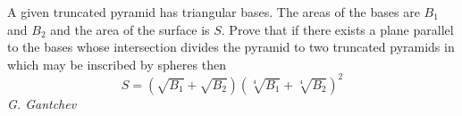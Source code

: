 A given truncated pyramid has triangular bases. The areas of the bases are $B_1$ and $B_2$ and the area of the surface is $S$. Prove that if there exists a plane parallel to the bases whose intersection divides the pyramid to two truncated pyramids in which may be inscribed by spheres then
$$S=(\sqrt{B_1}+\sqrt{B_2})(\sqrt[4]{B_1}+\sqrt[4]{B_2})^2$$
\textit{G. Gantchev}